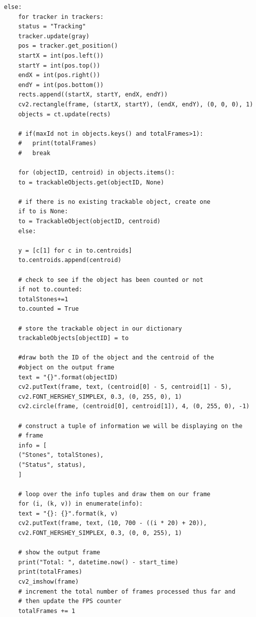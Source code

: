 \documentclass[times]{itmo-student-thesis}
\begin{document}
\begin{lstlisting}[caption={Корреляционный и центроидный трекер},label={lstX}]
	else:
	for tracker in trackers:
	status = "Tracking"
	tracker.update(gray)
	pos = tracker.get_position()
	startX = int(pos.left())
	startY = int(pos.top())
	endX = int(pos.right())
	endY = int(pos.bottom())
	rects.append((startX, startY, endX, endY))
	cv2.rectangle(frame, (startX, startY), (endX, endY), (0, 0, 0), 1)
	objects = ct.update(rects)
	
	# if(maxId not in objects.keys() and totalFrames>1):
	#   print(totalFrames)
	#   break
	
	for (objectID, centroid) in objects.items():
	to = trackableObjects.get(objectID, None)
	
	# if there is no existing trackable object, create one
	if to is None:
	to = TrackableObject(objectID, centroid)
	else:
	
	y = [c[1] for c in to.centroids]
	to.centroids.append(centroid)
	
	# check to see if the object has been counted or not
	if not to.counted:
	totalStones+=1 
	to.counted = True
	
	# store the trackable object in our dictionary
	trackableObjects[objectID] = to
	
	#draw both the ID of the object and the centroid of the
	#object on the output frame
	text = "{}".format(objectID)
	cv2.putText(frame, text, (centroid[0] - 5, centroid[1] - 5),
	cv2.FONT_HERSHEY_SIMPLEX, 0.3, (0, 255, 0), 1)
	cv2.circle(frame, (centroid[0], centroid[1]), 4, (0, 255, 0), -1)
	
	# construct a tuple of information we will be displaying on the
	# frame
	info = [
	("Stones", totalStones),
	("Status", status),
	]
	
	# loop over the info tuples and draw them on our frame
	for (i, (k, v)) in enumerate(info):
	text = "{}: {}".format(k, v)
	cv2.putText(frame, text, (10, 700 - ((i * 20) + 20)),
	cv2.FONT_HERSHEY_SIMPLEX, 0.3, (0, 0, 255), 1)
	
	# show the output frame
	print("Total: ", datetime.now() - start_time)
	print(totalFrames)
	cv2_imshow(frame)
	# increment the total number of frames processed thus far and
	# then update the FPS counter
	totalFrames += 1
	
	  \end{lstlisting}
\end{document}
